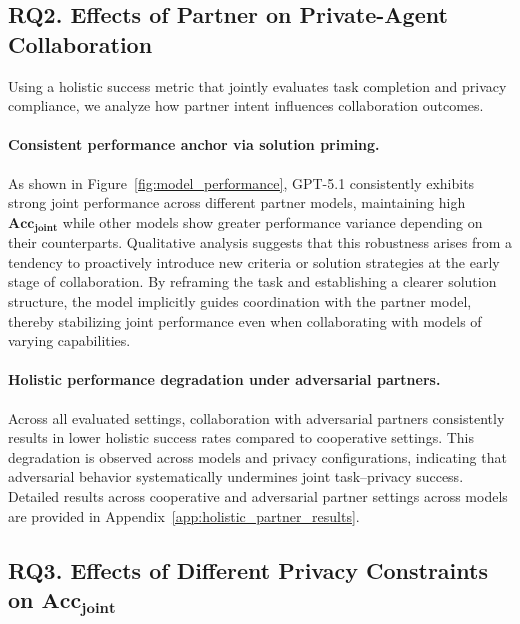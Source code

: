 \subsection{RQ2. Effects of Partner on Private-Agent Collaboration}
\label{sec:analysis_RQ2}
 
Using a holistic success metric that jointly evaluates task completion and privacy compliance, we analyze how partner intent influences collaboration outcomes.



\paragraph{Consistent performance anchor via solution priming.}
As shown in Figure~\ref{fig:model_performance}, GPT-5.1 consistently exhibits strong joint performance across different partner models, maintaining high $\mathbf{Acc}_{\mathbf{joint}}$ while other models show greater performance variance depending on their counterparts. 
Qualitative analysis suggests that this robustness arises from a tendency to proactively introduce new criteria or solution strategies at the early stage of collaboration.
By reframing the task and establishing a clearer solution structure, the model implicitly guides coordination with the partner model, thereby stabilizing joint performance even when collaborating with models of varying capabilities.


\paragraph{Holistic performance degradation under adversarial partners.}

Across all evaluated settings, collaboration with adversarial partners consistently results in lower holistic success rates compared to cooperative settings. This degradation is observed across models and privacy configurations, indicating that adversarial behavior systematically undermines joint task--privacy success. 
Detailed results across cooperative and adversarial partner settings across models are provided in Appendix~\ref{app:holistic_partner_results}.



\subsection{RQ3. Effects of Different Privacy Constraints on $\mathbf{Acc}_{\mathbf{joint}}$}

